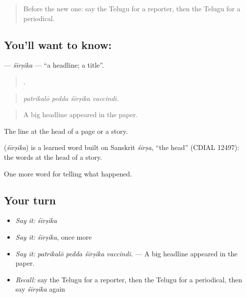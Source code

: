 \label{lesson:TE-C330-sirsika}



\begin{quote}
Before the new one: say the Telugu for a reporter, then the Telugu for a periodical.
\end{quote}

\subsection*{You'll want to know: }
\textbf{} — \emph{śīrṣika} — \textquotedblleft{}a headline; a title\textquotedblright{}.

\begin{quote}
   .
\end{quote}

\begin{quote}
\emph{patrikalō pedda śīrṣika vaccindi.}
\end{quote}

\begin{quote}
A big headline appeared in the paper.
\end{quote}

The line at the head of a page or a story.

\begin{cousinweb}
\textbf{} (\emph{śīrṣika}) is a learned word built on Sanskrit \emph{śīrṣa}, \textquotedblleft{}the head\textquotedblright{} (CDIAL 12497): the words at the head of a story.
\end{cousinweb}

\begin{grammarlens}[title={What you've built}]
One more word for telling what happened.
\end{grammarlens}

\subsection*{Your turn}
\begin{itemize}
\raggedright
  \item \emph{Say it:} \emph{śīrṣika}
  \item \emph{Say it:} \emph{śīrṣika}, once more
  \item \emph{Say it:} \emph{patrikalō pedda śīrṣika vaccindi.} — A big headline appeared in the paper.
  \item \emph{Recall:} say the Telugu for a reporter, then the Telugu for a periodical, then say \emph{śīrṣika} again
\end{itemize}

